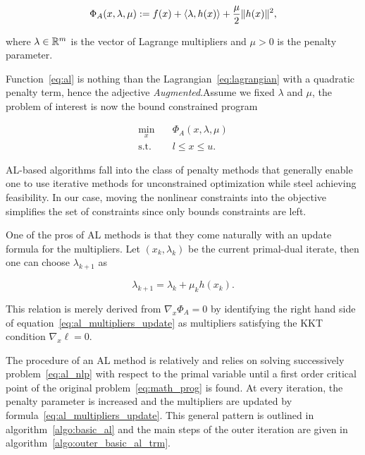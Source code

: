 \documentclass[10pt]{article}
\numberwithin{equation}{section}
\begin{document}
	 \begin{equation}
	 	\label{eq:al}
	 	\Phi_A(x,\lambda,\mu) := f(x) + \left\langle {\lambda} , {h(x)} \right\rangle + \dfrac{\mu}{2} \|h(x)\|^2,
	 \end{equation}
	 
	 where $\lambda\in {\mathbb{R}}^m$ is the vector of Lagrange multipliers and $\mu > 0$ is the penalty parameter.
	 
	 Function~\eqref{eq:al} is nothing than the Lagrangian~\eqref{eq:lagrangian} with a quadratic penalty term, hence the adjective \textit{Augmented}.Assume we fixed $\lambda$ and $\mu$, the problem of interest is now the bound constrained program
	 
	 \begin{equation}\label{eq:al_nlp}
	 	\begin{aligned}
	 		\min_x \quad & \Phi_A(x,\lambda,\mu) \\
	 		\text{s.t.} \quad & l \le x \le u.
	 	\end{aligned}
	 \end{equation}
	 
	 AL-based algorithms fall into the class of penalty methods that generally enable one to use iterative methods for unconstrained optimization  while steel achieving feasibility. In our case, moving the nonlinear constraints into the objective simplifies the set of constraints since only bounds constraints are left.
	 
	 One of the pros of AL methods is that they come naturally with an update formula for the multipliers. Let \((x_k,\lambda_k)\) be the current primal-dual iterate, then one can choose \(\lambda_{k+1} \) as
	 
	 \begin{equation}\label{eq:al_multipliers_update}
	 	\lambda_{k+1} = \lambda_k + \mu_kh(x_k).
	 \end{equation}
	 
	 This relation is merely derived from \(\nabla_x\Phi_A=0\) by identifying the right hand side of equation~\eqref{eq:al_multipliers_update} as multipliers satisfying the KKT condition \(\nabla_x \ell =0\).
	 
	 The procedure of an AL method is relatively  and relies on solving successively  problem~\eqref{eq:al_nlp} with respect to the primal variable until a first order critical point of the original problem~\eqref{eq:math_prog} is found. At every iteration, the penalty parameter is increased and the multipliers are updated by formula~\eqref{eq:al_multipliers_update}. This general pattern is outlined in algorithm~\ref{algo:basic_al} and the main steps of the outer iteration are given in  algorithm~\ref{algo:outer_basic_al_trm}.
	 
\end{document}
